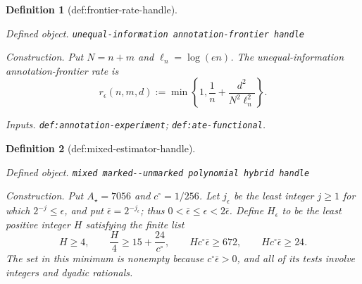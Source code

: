 \documentclass{article}
\newtheorem{definition}{Definition}
\begin{document}
\begin{definition}[def:frontier-rate-handle]\label{def:frontier-rate-handle}
\par\smallskip\noindent\emph{Defined object.} \texttt{unequal-\allowbreak{}information annotation-\allowbreak{}frontier handle}
\par\smallskip\noindent\emph{Construction.} Put \(N=n+m\) and \(\ell_n=\log(en)\).  The unequal-information annotation-frontier rate is
\[
r_\epsilon(n,m,d):=\min\!\left\{1,\frac1n+\frac{d^2}{N^2\ell_n^2}\right\}.
\]
\par\smallskip\noindent\emph{Inputs.} \texttt{def:\allowbreak{}annotation-\allowbreak{}experiment}; \texttt{def:\allowbreak{}ate-\allowbreak{}functional}.
\end{definition}

\begin{definition}[def:mixed-estimator-handle]\label{def:mixed-estimator-handle}
\par\smallskip\noindent\emph{Defined object.} \texttt{mixed marked-\allowbreak{}-\allowbreak{}unmarked polynomial hybrid handle}
\par\smallskip\noindent\emph{Construction.} Put \(A_\star=7056\) and \(c^\circ=1/256\).  Let \(j_\epsilon\) be the least integer \(j\ge1\) for which \(2^{-j}\le\epsilon\), and put \(\bar\epsilon=2^{-j_\epsilon}\); thus \(0<\bar\epsilon\le\epsilon<2\bar\epsilon\).  Define \(H_\epsilon\) to be the least positive integer \(H\) satisfying the finite list
\[
 H\ge4,\qquad \frac H4\ge15+\frac{24}{c^\circ},\qquad
 Hc^\circ\bar\epsilon\ge672,
 \qquad Hc^\circ\bar\epsilon\ge24.                                      \tag{C1}
\]
The set in this minimum is nonempty because \(c^\circ\bar\epsilon>0\), and all of its tests involve integers and dyadic rationals.


\end{definition}
\end{document}
